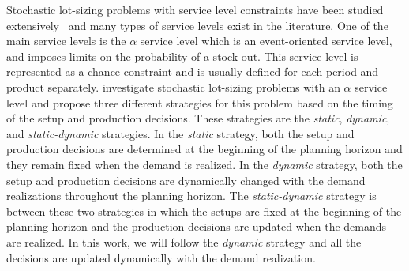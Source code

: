 \documentclass[msom]{oo}
\begin{document}
Stochastic lot-sizing problems with service level constraints have been studied extensively~\citep{tempelmeier2007stochastic} and many types of service levels exist in the literature. One of the main service levels is the $\alpha$ service level which is an event-oriented service level, and imposes limits on the probability of a stock-out. This service level is represented as a chance-constraint and is usually defined for each period and product separately. \cite{bookbinder1988strategies} investigate stochastic lot-sizing problems with an $\alpha$ service level and propose three different strategies for this problem based on the timing of the setup and production decisions. These strategies are the \textit{static}, \textit{dynamic}, and \textit{static-dynamic} strategies. In the \textit{static} strategy, both the setup and production decisions are determined at the beginning of the planning horizon and they remain fixed when the demand is realized. In the \textit{dynamic} strategy, both the setup and production decisions are dynamically changed with the demand realizations throughout the planning horizon. The \textit{static-dynamic} strategy is between these two strategies in which the setups are fixed at the beginning of the planning horizon and the production decisions are updated when the demands are realized. In this work, we will follow the \textit{dynamic} strategy and all the decisions are updated dynamically with the demand realization. %
\end{document}
